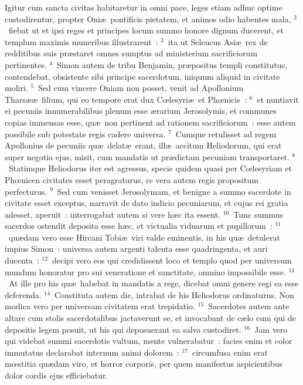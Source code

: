 \bchapter
\lettrine[lines=3,image=true,loversize=0.05,lraise=-0.03]{I}{}gitur cum sancta civitas habitaretur in omni pace, leges etiam adhuc optime custodirentur, propter Oni\ae\ pontificis pietatem, et animos odio habentes mala,
${}^{2}$~fiebat ut et ipsi reges et principes locum summo honore dignum ducerent, et templum maximis muneribus illustrarent~:
${}^{3}$~ita ut Seleucus Asi\ae\ rex de redditibus suis pr\ae staret omnes sumptus ad ministerium sacrificiorum pertinentes.
${}^{4}$~Simon autem de tribu Benjamin, pr\ae positus templi constitutus, contendebat, obsistente sibi principe sacerdotum, iniquum aliquid in civitate moliri.
${}^{5}$~Sed cum vincere Oniam non posset, venit ad Apollonium Thars\ae \ae\ filium, qui eo tempore erat dux Cœlesyri\ae\ et Phœnicis~:
${}^{6}$~et nuntiavit ei pecuniis innumerabilibus plenum esse \ae rarium Jerosolymis, et communes copias immensas esse, qu\ae\ non pertinent ad rationem sacrificiorum~: esse autem possibile sub potestate regis cadere universa.
${}^{7}$~Cumque retulisset ad regem Apollonius de pecuniis qu\ae\ delat\ae\ erant, ill\ae\ accitum Heliodorum, qui erat super negotia ejus, misit, cum mandatis ut pr\ae dictam pecuniam transportaret.
${}^{8}$~Statimque Heliodorus iter est agressus, specie quidem quasi per Cœlesyriam et Phœnicen civitates esset peragraturus, re vera autem regis propositum perfecturus.
${}^{9}$~Sed cum venisset Jerosolymam, et benigne a summo sacerdote in civitate esset exceptus, narravit de dato indicio pecuniarum, et cujus rei gratia adesset, aperuit~: interrogabat autem si vere h\ae c ita essent.
${}^{10}$~Tunc summus sacerdos ostendit deposita esse h\ae c, et victualia viduarum et pupillorum~:
${}^{11}$~qu\ae dam vero esse Hircani Tobi\ae\ viri valde eminentis, in his qu\ae\ detulerat impius Simon~: universa autem argenti talenta esse quadringenta, et auri ducenta~:
${}^{12}$~decipi vero eos qui credidissent loco et templo quod per universum mundum honoratur pro sui veneratione et sanctitate, omnino impossibile esse.
${}^{13}$~At ille pro his qu\ae\ habebat in mandatis a rege, dicebat omni genere regi ea esse deferenda.
${}^{14}$~Constituta autem die, intrabat de his Heliodorus ordinaturus. Non modica vero per universam civitatem erat trepidatio.
${}^{15}$~Sacerdotes autem ante altare cum stolis sacerdotalibus jactaverunt se, et invocabant de c\ae lo eum qui de depositis legem posuit, ut his qui deposuerant ea salva custodiret.
${}^{16}$~Jam vero qui videbat summi sacerdotis vultum, mente vulnerabatur~: facies enim et color immutatus declarabat internum animi dolorem~:
${}^{17}$~circumfusa enim erat mœstitia qu\ae dam viro, et horror corporis, per quem manifestus aspicientibus dolor cordis ejus efficiebatur.
